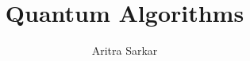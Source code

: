 \documentclass{tudelft-report}
\begin{document}
\title[for pattern-matching\\in genomic sequences]{Quantum Algorithms}
\author{Aritra Sarkar}

\makecover[back]
\end{document}
